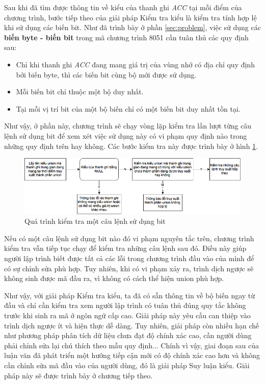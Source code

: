 Sau khi đã tìm được thông tin về kiểu của thanh ghi \textit{ACC} tại mỗi điểm của chương trình, bước tiếp theo của giải pháp Kiểm tra kiểu là kiểm tra tính hợp lệ khi sử dụng các biến bit. Như đã trình bày ở phần \ref{sec:problem}, việc sử dụng các \textbf{biến byte - biến bit} trong mã chương trình 8051 cần tuân thủ các quy định sau:
\begin{itemize}
	\item Chỉ khi thanh ghi \textit{ACC} đang mang giá trị của vùng nhớ có địa chỉ quy định bởi biến byte, thì các biến bit cùng bộ mới được sử dụng.
	\item Mỗi biến bit chỉ thuộc một bộ duy nhất. 
	\item Tại mỗi vị trí bit của một bộ biến chỉ có một biến bit duy nhất tồn tại. 
\end{itemize}
Như vậy, ở phần này, chương trình sẽ chạy vòng lặp kiểm tra lần lượt từng câu lệnh sử dụng bit để xem xét việc sử dụng này có vi phạm quy định nào trong những quy định trên hay không. Các bước kiểm tra này được trình bày ở hình \ref{fig:checkunionsteps}.
\begin{figure}
	\centering
	\includegraphics[width=0.7\linewidth]{image/checkUnionSteps}
	\caption{Quá trình kiểm tra một câu lệnh sử dụng bit}
	\label{fig:checkunionsteps}
\end{figure}
Nếu có một câu lệnh sử dụng bit nào đó vi phạm nguyên tắc trên, chương trình kiểm tra vẫn tiếp tục chạy để kiểm tra những câu lệnh sau đó. Điều này giúp người lập trình biết được tất cả các lỗi trong chương trình đầu vào của mình để có sự chỉnh sửa phù hợp. Tuy nhiên, khi có vi phạm xảy ra, trình dịch ngược sẽ không sinh được mã đầu ra, vì không có cách thể hiện union phù hợp.


Như vậy, với giải pháp Kiểm tra kiểu, ta đã có sẵn thông tin về bộ biến ngay từ đầu và chỉ cần kiểm tra xem người lập trình có tuân thủ đúng quy tắc không trước khi sinh ra mã ở ngôn ngữ cấp cao. Giải pháp này yêu cầu can thiệp vào trình dịch ngược ít và hiện thực dễ dàng. Tuy nhiên, giải pháp còn nhiều hạn chế như phương pháp phân tích dữ liệu chưa đạt độ chính xác cao, cần người dùng phải chỉnh sửa lại chú thích theo mẫu quy định... Chính vì vậy, giai đoạn sau của luận văn đã phát triển một hướng tiếp cận mới có độ chính xác cao hơn và không cần chỉnh sửa mã đầu vào của người dùng, đó là giải pháp Suy luận kiểu. Giải pháp này sẽ được trình bày ở chương tiếp theo.



